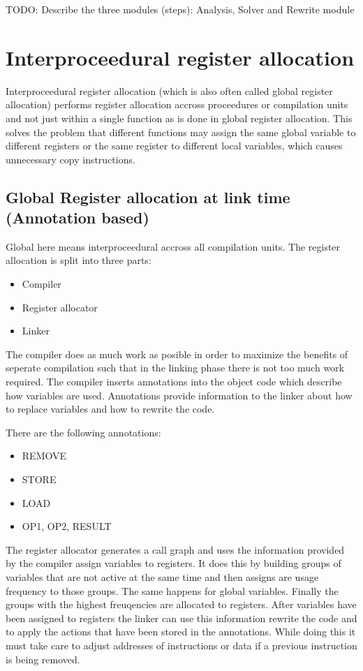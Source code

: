 \documentclass[a4paper,10pt]{article}
\begin{document}
TODO: Describe the three modules (steps): Analysis, Solver and Rewrite module

\section{Interproceedural register allocation}
Interproceedural register allocation (which is also often called global register allocation) performs register allocation accross
proceedures or compilation units and not just within a single function as is done in global register allocation. This solves the problem
that different functions may assign the same global variable to different registers or the same register to different local variables, 
which causes unnecessary copy instructions.

\subsection{Global Register allocation at link time (Annotation based)}
Global here means interproceedural accross all compilation units. The register allocation is split into three parts:
\begin{itemize}
 \item Compiler
 \item Register allocator
 \item Linker
\end{itemize}
The compiler does as much work as posible in order to maximize the benefits of seperate compilation such that in the linking phase there 
is not too much work required. The compiler inserts annotations into the object code which describe how variables are used. Annotations 
provide information to the linker about how to replace variables and how to rewrite the code.

There are the following annotations:
\begin{itemize}
 \item REMOVE
 \item STORE
 \item LOAD
 \item OP1, OP2, RESULT
\end{itemize}

The register allocator generates a call graph and uses the information provided by the compiler assign variables to registers. It does 
this by building groups of variables that are not active at the same time and then assigns are usage frequency to those groups. The same 
happens for global variables. Finally the groups with the highest freuqencies are allocated to registers. After variables have been 
assigned to registers the linker can use this information rewrite the code and to apply the actions that have been stored in the 
annotations. While doing this it must take care to adjust addresses of instructions or data if a previous instruction is being removed.
\end{document}
